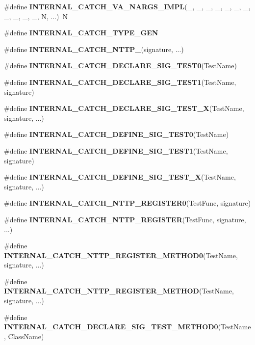 \begin{DoxyCompactItemize}
\item 
\#define \textbf{ I\+N\+T\+E\+R\+N\+A\+L\+\_\+\+C\+A\+T\+C\+H\+\_\+\+V\+A\+\_\+\+N\+A\+R\+G\+S\+\_\+\+I\+M\+PL}(\+\_,  \+\_,  \+\_,  \+\_,  \+\_,  \+\_,  \+\_,  \+\_,  \+\_,  \+\_,  \+\_,  N, ...)~N
\item 
\#define \textbf{ I\+N\+T\+E\+R\+N\+A\+L\+\_\+\+C\+A\+T\+C\+H\+\_\+\+T\+Y\+P\+E\+\_\+\+G\+EN}
\item 
\#define \textbf{ I\+N\+T\+E\+R\+N\+A\+L\+\_\+\+C\+A\+T\+C\+H\+\_\+\+N\+T\+T\+P\+\_}(signature, ...)
\item 
\#define \textbf{ I\+N\+T\+E\+R\+N\+A\+L\+\_\+\+C\+A\+T\+C\+H\+\_\+\+D\+E\+C\+L\+A\+R\+E\+\_\+\+S\+I\+G\+\_\+\+T\+E\+S\+T0}(Test\+Name)
\item 
\#define \textbf{ I\+N\+T\+E\+R\+N\+A\+L\+\_\+\+C\+A\+T\+C\+H\+\_\+\+D\+E\+C\+L\+A\+R\+E\+\_\+\+S\+I\+G\+\_\+\+T\+E\+S\+T1}(Test\+Name,  signature)
\item 
\#define \textbf{ I\+N\+T\+E\+R\+N\+A\+L\+\_\+\+C\+A\+T\+C\+H\+\_\+\+D\+E\+C\+L\+A\+R\+E\+\_\+\+S\+I\+G\+\_\+\+T\+E\+S\+T\+\_\+X}(Test\+Name,  signature, ...)
\item 
\#define \textbf{ I\+N\+T\+E\+R\+N\+A\+L\+\_\+\+C\+A\+T\+C\+H\+\_\+\+D\+E\+F\+I\+N\+E\+\_\+\+S\+I\+G\+\_\+\+T\+E\+S\+T0}(Test\+Name)
\item 
\#define \textbf{ I\+N\+T\+E\+R\+N\+A\+L\+\_\+\+C\+A\+T\+C\+H\+\_\+\+D\+E\+F\+I\+N\+E\+\_\+\+S\+I\+G\+\_\+\+T\+E\+S\+T1}(Test\+Name,  signature)
\item 
\#define \textbf{ I\+N\+T\+E\+R\+N\+A\+L\+\_\+\+C\+A\+T\+C\+H\+\_\+\+D\+E\+F\+I\+N\+E\+\_\+\+S\+I\+G\+\_\+\+T\+E\+S\+T\+\_\+X}(Test\+Name,  signature, ...)
\item 
\#define \textbf{ I\+N\+T\+E\+R\+N\+A\+L\+\_\+\+C\+A\+T\+C\+H\+\_\+\+N\+T\+T\+P\+\_\+\+R\+E\+G\+I\+S\+T\+E\+R0}(Test\+Func,  signature)
\item 
\#define \textbf{ I\+N\+T\+E\+R\+N\+A\+L\+\_\+\+C\+A\+T\+C\+H\+\_\+\+N\+T\+T\+P\+\_\+\+R\+E\+G\+I\+S\+T\+ER}(Test\+Func,  signature, ...)
\item 
\#define \textbf{ I\+N\+T\+E\+R\+N\+A\+L\+\_\+\+C\+A\+T\+C\+H\+\_\+\+N\+T\+T\+P\+\_\+\+R\+E\+G\+I\+S\+T\+E\+R\+\_\+\+M\+E\+T\+H\+O\+D0}(Test\+Name,  signature, ...)
\item 
\#define \textbf{ I\+N\+T\+E\+R\+N\+A\+L\+\_\+\+C\+A\+T\+C\+H\+\_\+\+N\+T\+T\+P\+\_\+\+R\+E\+G\+I\+S\+T\+E\+R\+\_\+\+M\+E\+T\+H\+OD}(Test\+Name,  signature, ...)
\item 
\#define \textbf{ I\+N\+T\+E\+R\+N\+A\+L\+\_\+\+C\+A\+T\+C\+H\+\_\+\+D\+E\+C\+L\+A\+R\+E\+\_\+\+S\+I\+G\+\_\+\+T\+E\+S\+T\+\_\+\+M\+E\+T\+H\+O\+D0}(Test\+Name,  Class\+Name)

\end{DoxyCompactItemize}
